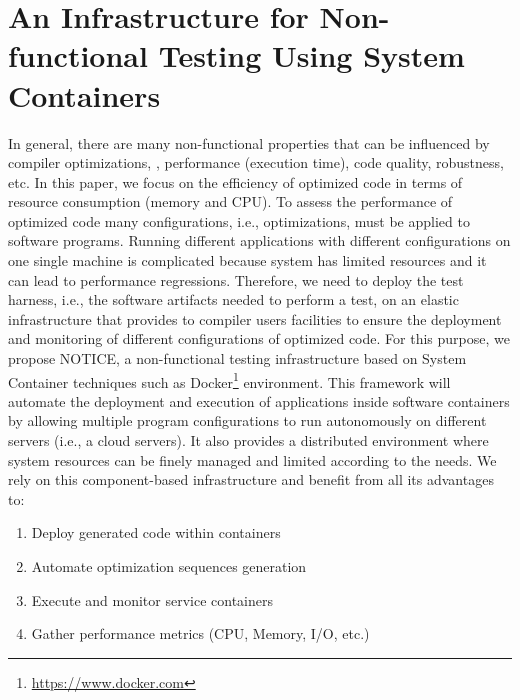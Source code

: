 \section{An Infrastructure for Non-functional Testing Using System Containers}
In general, there are many non-functional properties that can be influenced by compiler optimizations, \eg, performance (execution time), code quality, robustness, etc. 
In this paper, we focus on the efficiency of optimized code in terms of resource consumption (memory and CPU). 
To assess the performance of optimized code many configurations, i.e., optimizations, must be applied to software programs. Running different applications with different configurations on one single machine is complicated because system has limited resources and it can lead to performance regressions. 
Therefore, we need to deploy the test harness, i.e., the software artifacts needed to perform a test, on an elastic infrastructure that provides to compiler users facilities to ensure the deployment and monitoring of different configurations of optimized code. 
For this purpose, we propose NOTICE, a non-functional testing infrastructure based on System Container techniques such as Docker\footnote{\url{https://www.docker.com}} environment. 
This framework will automate the deployment and execution of applications inside software containers by allowing multiple program configurations to run autonomously on different servers (i.e., a cloud servers). It also provides a distributed environment where system resources can be finely managed and limited according to the needs. 
We rely on this component-based infrastructure and benefit from all its advantages to:
\begin{enumerate}
	\item Deploy generated code within containers
	\item Automate optimization sequences generation
	\item Execute and monitor service containers
	\item Gather performance metrics (CPU, Memory, I/O, etc.)
\end{enumerate}


